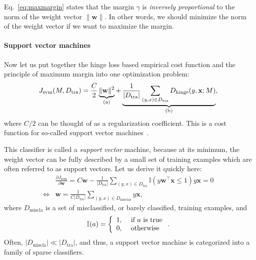 \documentclass{report}
\newcommand{\vect}[1]{\mathbf{#1}}
\newcommand{\vx}[0]{\vect{x}}
\newcommand{\vw}[0]{\vect{w}}
\newcommand{\todo}[1]{{\Large\textcolor{red}{#1}}}
\newcommand{\hinge}{\text{hinge}}
\newcommand{\tra}{\text{tra}}
\begin{document}
Eq.~\eqref{eq:maxmargin} states that the margin $\gamma$ is {\it inversely
proportional} to the norm of the weight vector $\| \vw\|$. In other words, we
should minimize the norm of the weight vector if we want to maximize the margin.

\paragraph{Support vector machines}

Now let us put together the hinge loss based empirical cost function and the
principle of maximum margin into one optimization problem:
\begin{align}
    \label{eq:svm}
    J_{\text{svm}}(M,D_{\tra}) = \frac{C}{2}
    \underbrace{\|\vw\|^2}_{\mathclap{\text{(a)}}} + 
    \underbrace{\frac{1}{|D_{\tra}|} \sum_{(y,x)
    \in D_{\tra}} D_{\hinge}(y, \vx; M)}_{
        \mathclap{\text{(b)}}
    },
\end{align}
where $C/2$ can be thought of as a regularization coefficient. This is a cost
function for so-called support vector machines~\cite{cortes1995support}. 

This classifier is called a {\it support vector} machine, because at its
minimum, the weight vector can be fully described by a small set of training
examples which are often referred to as support vectors. Let us derive it
quickly here:
\begin{align*}
    &\frac{\partial J_{\text{svm}}}{\partial \vw} = 
    C \vw - \frac{1}{|D_{\tra}|} \sum_{(y, x) \in D_{\tra}} \mathbb{I}(y\vw^\top
    \vx \leq 1) y \vx = 0 \\
    \Leftrightarrow&
    \vw = \frac{1}{C|D_{\tra}|} \sum_{(y, x) \in D_{\text{misclas}}} y \vx,
\end{align*}
where $D_{\text{miscla}}$ is a set of misclassified, or barely classified,
training examples, and
\begin{align*}
    \mathbb{I}(a) = \left\{ 
        \begin{array}{l l}
            1,&\text{ if }a\text{ is true} \\
            0,&\text{ otherwise}
        \end{array}
        \right..
\end{align*} 
Often, $|D_{\text{miscla}}| \ll |D_{\tra}|$, and thus, a support vector machine
is categorized into a family of sparse classifiers.

%
%
%
\end{document}
